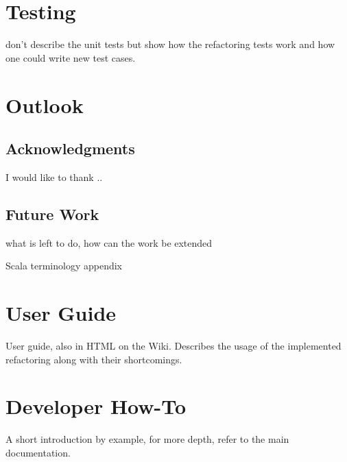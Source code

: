 \documentclass[10pt,a4paper,oneside]{scrreprt}
\begin{document}
\chapter{Testing}

don't describe the unit tests but show how the refactoring tests work and how one could write new test cases.

\chapter{Outlook}

\section{Acknowledgments}

I would like to thank ..

\section{Future Work}

what is left to do, how can the work be extended

\appendix

Scala terminology appendix

\chapter{User Guide}

User guide, also in HTML on the Wiki. Describes the usage of the implemented refactoring along with their shortcomings.

\chapter{Developer How-To}

A short introduction by example, for more depth, refer to the main documentation.




\clearpage
\bib
\end{document}
